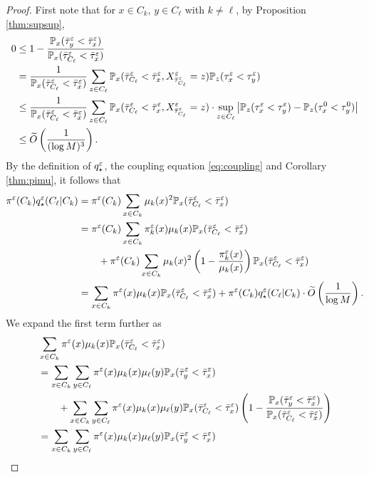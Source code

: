 \begin{proof}
First note that for $x\in C_k$, $y\in C_\ell$ with $k\neq\ell$, by Proposition \ref{thm:supsup},
\begin{align*}
0&\le 1-\frac{\mathbb{P}_x(\bar{\tau}_y^\varepsilon < \bar{\tau}_x^\varepsilon)}{\mathbb{P}_x(\bar{\tau}_{C_\ell}^\varepsilon < \bar{\tau}_x^\varepsilon)}\\
&= \frac{1}{\mathbb{P}_x(\bar{\tau}_{C_\ell}^\varepsilon < \bar{\tau}_x^\varepsilon)} \sum_{z\in C_\ell} \mathbb{P}_x(\bar{\tau}_{C_\ell}^\varepsilon < \bar{\tau}_x^\varepsilon, X_{\bar{\tau}_{C_\ell}^\varepsilon}^\varepsilon = z) \mathbb{P}_z(\tau_x^\varepsilon < \tau_y^\varepsilon)\\
&\le \frac{1}{\mathbb{P}_x(\bar{\tau}_{C_\ell}^\varepsilon < \bar{\tau}_x^\varepsilon)} \sum_{z\in C_\ell} \mathbb{P}_x(\bar{\tau}_{C_\ell}^\varepsilon < \bar{\tau}_x^\varepsilon, X_{\bar{\tau}_{C_\ell}^\varepsilon}^\varepsilon = z)\cdot \sup_{z\in C_\ell} \left\lvert\mathbb{P}_z(\tau_x^\varepsilon < \tau_y^\varepsilon) - \mathbb{P}_z(\tau_x^0 < \tau_y^0)\right\rvert \\
&\le \widetilde{O}\left(\frac{1}{(\log M)^3}\right).
\end{align*}
By the definition of $q_\star^\varepsilon$, the coupling equation \eqref{eq:coupling} and Corollary \ref{thm:pimu}, it follows that
\begin{align*}
\pi^\varepsilon(C_k)q_\star^\varepsilon(C_\ell|C_k) &= \pi^\varepsilon(C_k) \sum_{x\in C_k} \mu_k(x)^2 \mathbb{P}_x(\bar{\tau}_{C_\ell}^\varepsilon < \bar{\tau}_x^\varepsilon) \\
&= \pi^\varepsilon(C_k) \sum_{x\in C_k} \pi_k^\varepsilon(x)\mu_k(x) \mathbb{P}_x(\bar{\tau}_{C_\ell}^\varepsilon < \bar{\tau}_x^\varepsilon)\\
&\qquad + \pi^\varepsilon(C_k)\sum_{x\in C_k} \mu_k(x)^2\left(1 - \frac{\pi_k^\varepsilon(x)}{\mu_k(x)}\right) \mathbb{P}_x(\bar{\tau}_{C_\ell}^\varepsilon < \bar{\tau}_x^\varepsilon) \\
&= \sum_{x\in C_k} \pi^\varepsilon(x)\mu_k(x) \mathbb{P}_x(\bar{\tau}_{C_\ell}^\varepsilon < \bar{\tau}_x^\varepsilon) + \pi^\varepsilon(C_k)q_\star^\varepsilon(C_\ell|C_k) \cdot \widetilde{O}\left(\frac{1}{\log M}\right).
\end{align*}
We expand the first term further as
\begin{align*}
&\sum_{x\in C_k} \pi^\ep(x)\mu_k(x) \PP_x(\bar{\tau}_{C_\ell}^\ep < \bar{\tau}_x^\ep)\\
&= \sum_{x\in C_k}\sum_{y\in C_\ell} \pi^\ep(x)\mu_k(x)\mu_\ell(y) \PP_x(\bar{\tau}_y^\ep < \bar{\tau}_x^\ep)\\
&\qquad + \sum_{x\in C_k}\sum_{y\in C_\ell} \pi^\ep(x)\mu_k(x)\mu_\ell(y) \PP_x(\bar{\tau}_{C_\ell}^\ep < \bar{\tau}_x^\ep) \left(1 - \frac{\PP_x(\bar{\tau}_y^\ep < \bar{\tau}_x^\ep)}{\PP_x(\bar{\tau}_{C_\ell}^\ep < \bar{\tau}_x^\ep)}\right) \\
&= \sum_{x\in C_k}\sum_{y\in C_\ell} \pi^\ep(x)\mu_k(x)\mu_\ell(y) \PP_x(\bar{\tau}_y^\ep < \bar{\tau}_x^\ep)\\

\end{align*}
\end{proof}

